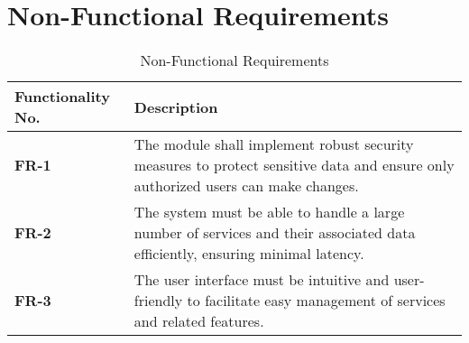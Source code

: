 \documentclass[12pt,a4paper]{article}
\begin{document}
\section{Non-Functional Requirements}
\begin{table}[h!]
\caption{Non-Functional Requirements}
    \centering
    \begin{tabular}{|l|p{7cm}|}
    \hline
       \textbf{Functionality No.}&\textbf{Description} \\ %
       \hline
       \textbf{FR-1}&The module shall implement robust security measures to protect sensitive data and ensure only authorized users can make changes.\\ %
       \hline
         \textbf{FR-2}&The system must be able to handle a large number of services and their associated data efficiently, ensuring minimal latency.
\\ %
       \hline
       \textbf{FR-3}&The user interface must be intuitive and user-friendly to facilitate easy management of services and related features.
 \\ %
       \hline
    \end{tabular}
\end{table}
\end{document}
